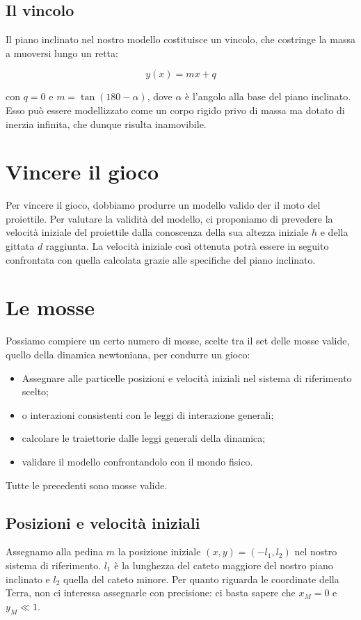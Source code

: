 \documentclass{article}
\begin{document}
\subsection{Il vincolo}
Il piano inclinato nel nostro modello costituisce un vincolo,
che costringe la massa a muoversi lungo un retta:

\begin{equation}
y(x) = m x + q
\end{equation}

con $q = 0$ e $m = \tan (180 -\alpha)$, dove $\alpha$ è l'angolo
alla base del piano inclinato.
Esso può essere modellizzato come un corpo rigido privo di massa
ma dotato di inerzia infinita, che dunque risulta inamovibile.

\section{Vincere il gioco}
Per vincere il gioco, dobbiamo produrre un modello valido
der il moto del proiettile. Per valutare la validità
del modello, ci proponiamo di prevedere la velocità iniziale
del proiettile dalla conoscenza della sua altezza iniziale
$h$ e della gittata $d$ raggiunta. La velocità iniziale
così ottenuta potrà essere in seguito confrontata con quella
calcolata grazie alle specifiche del piano inclinato.

\section{Le mosse}
Possiamo compiere un certo numero di mosse, scelte tra il set
delle mosse valide, quello della dinamica newtoniana, per
condurre un gioco:

\begin{itemize}
\item Assegnare alle particelle posizioni e velocità iniziali nel sistema di riferimento scelto;
\item o interazioni consistenti con le leggi di interazione generali;
\item calcolare le traiettorie dalle leggi generali della dinamica;
\item validare il modello confrontandolo con il mondo fisico.
\end{itemize}

Tutte le precedenti sono mosse valide.

\subsection{Posizioni e velocità iniziali}
Assegnamo alla pedina $m$ la posizione iniziale $(x,y) = (-l_1,l_2)$ nel nostro
sistema di riferimento.
$l_1$ è la lunghezza del cateto maggiore del nostro piano inclinato e $l_2$
quella del cateto minore.
Per quanto riguarda le coordinate della
Terra, non ci interessa assegnarle con precisione: ci basta sapere
che $x_M = 0$ e $y_M \ll 1$.
\end{document}
